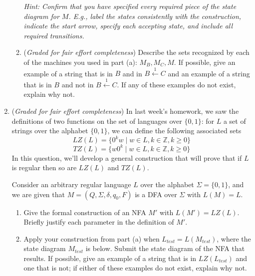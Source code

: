 \documentclass[12pt, oneside]{article}
\begin{document}
\begin{enumerate}
\begin{enumerate}
{\it Hint: Confirm that you have specified every required piece of the state diagram for $M$. E.g., 
label the states consistently with the construction, indicate the start arrow, specify each
accepting state, and include all required transitions.}

\item ({\it Graded for fair effort completeness})  Describe the sets recognized by each of the 
machines you used in part (a): $M_B, M_C, M$.
If possible, give an example of a string that is in $B$ and in $B \overset{1}{\leftarrow} C$
and an example of a string that is in $B$ and not in $B \overset{1}{\leftarrow} C$. If any of these examples
do not exist, explain why not.
\end{enumerate}


\item ({\it Graded for fair effort completeness}) In last week's homework, 
we saw the definitions of two functions on the set of languages over $\{0,1\}$:
for $L$ a set of strings over the alphabet $\{0,1\}$, we can define the following associated sets
\[
LZ(L) = \{ 0^k w \mid w \in L, k \in \mathbb{Z}, k \geq 0 \}
\]
\[
TZ(L) = \{ w 0^k \mid w \in L, k \in \mathbb{Z}, k \geq 0 \}
\]
In this question, we'll develop a general construction that will prove
that if $L$ is regular then so are $LZ(L)$ and $TZ(L)$.

Consider an arbitrary regular
language $L$ over the alphabet $\Sigma = \{0,1\}$, and we are given that
$M = (Q, \Sigma, \delta, q_0, F)$ is a DFA over $\Sigma$ with $L(M) = L$.

\begin{enumerate}
\item Give the formal construction of an NFA $M'$ with $L(M') = LZ(L)$.  Briefly justify 
each parameter in the definition of  $M'$.
\item Apply your construction from part (a) when $L_{test} = L(M_{test})$, where the 
state diagram $M_{test}$ is below.  Submit the state diagram of the NFA that results.
If possible, give an example of a string that is in $LZ(L_{test})$ and one that is not; if either of these examples
do not exist, explain why not.


\end{enumerate}
\end{enumerate}
\end{document}
